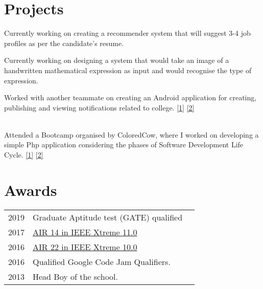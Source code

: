\documentclass[]{deedy-resume-openfont}
\begin{document}
\begin{minipage}[t]{0.66\textwidth}

\section{Projects}

Currently working on creating a recommender system that will suggest 3-4 job profiles as per the candidate's resume.
\sectionsep

Currently working on designing a system that would take an image of a handwritten mathematical expression as input
and would recognise the type of expression.
\sectionsep

Worked with another teammate on creating an Android application for creating, publishing and viewing notifications related to college.
\href{https://github.com/Yathartha22/notices-api}{[1]}
\href{https://drive.google.com/file/d/0B5EALEdIC0ktZ1JQRUhCdjZ1Z1NxSkVHT3Mwb3Rab3JtRmQ0/view?usp=sharing}{[2]}
\sectionsep

 \\
Attended a Bootcamp organised by ColoredCow, where I worked on developing a simple Php application considering the phases of
Software Development Life Cycle.
\href{https://github.com/Yathartha22/codetrek}{[1]}
\href{https://drive.google.com/file/d/0B5EALEdIC0ktY2thRjhxbUtrU1FDWERfYnR3aEd3QVZyVzVr/view?usp=sharing}{[2]}
\sectionsep


\section{Awards} 
\begin{tabular}{rll}
2019	    & Graduate Aptitude test (GATE) qualified\\
2017		& \href{https://drive.google.com/file/d/0B5EALEdIC0ktNFRBOWhNZk4wcTdnY253bnJNQVY0dmZCRkEw/view?usp=sharing}{AIR 14 in IEEE Xtreme 11.0}\\
2016		& \href{https://drive.google.com/file/d/0B5EALEdIC0ktNFRBOWhNZk4wcTdnY253bnJNQVY0dmZCRkEw/view?usp=sharing}{AIR 22 in IEEE Xtreme 10.0}\\
2016		& Qualified Google Code Jam Qualifiers.\\
2013	 	& Head Boy of the school.


\end{tabular}
\end{minipage}
\end{document}
